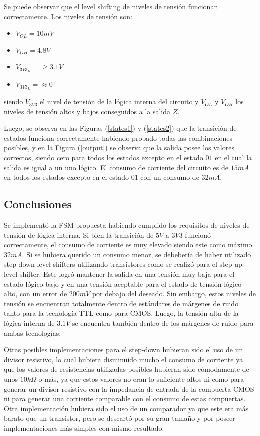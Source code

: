 Se puede observar que el level shifting de niveles de tensión funcionan correctamente. Los niveles de tensión son:
\begin{itemize}
\item $V_{OL} = 10mV$
\item $V_{OH} = 4.8V$
\item $V_{3V3_{H}} = \geq 3.1V$
\item $V_{3V3_{L}} = \approx 0$
\end{itemize}
siendo $V_{3V3}$ el nivel de tensión de la lógica interna del circuito y $V_{OL}$ y $V_{OH}$ los niveles de tensión altos y bajos conseguidos a la salida $Z$.

Luego, se observa en las Figuras (\ref{states1}) y (\ref{states2}) que la transición de estados funciona correctamente habiendo probado todas las combinaciones posibles, y en la Figura (\ref{output}) se observa que la salida posee los valores correctos, siendo cero para todos los estados excepto en el estado $01$ en el cual la salida es igual a un uno lógico. 
El consumo de corriente del circuito es de $15mA$ en todos los estados excepto en el estado $01$ con un consumo de $32mA$.

\subsection{Conclusiones}

Se implementó la FSM propuesta habiendo cumplido los requisitos de niveles de tensión de lógica interna. Si bien la transición de $5V$ a $3V3$ funcionó correctamente, el consumo de corriente es muy elevado siendo este como máximo $32mA$. Si se hubiera querido un consumo menor, se debebería de haber utilizado step-down level-shifters utilizando transistores como se realizó para el step-up level-shifter. Este logró mantener la salida en una tensión muy baja para el estado lógico bajo y en una tensión aceptable para el estado de tensión lógico alto, con un error de $200mV$ por debajo del deseado. Sin embargo, estos niveles de tensión se encuentran totalmente dentro de estándares de márgenes de ruido tanto para la tecnología TTL como para CMOS. Luego, la tensión alta de la lógica interna de $3.1V$ se encuentra también dentro de los márgenes de ruido para ambas tecnologías.


Otras posibles implementaciones para el step-down hubieran sido el uso de un divisor resistivo, lo cual hubiera disminuido mucho el consumo de corriente ya que los valores de resistencias utilizadas posibles hubieran sido cómodamente de unos $10k\Omega$ o más, ya que estos valores no eran lo suficiente altos ni como para generar un divisor resistivo con la impedancia de entrada de la compuerta CMOS ni para generar una corriente comparable con el consumo de estas compuertas. Otra implementación hubiera sido el uso de un comparador ya que este era más barato que un transistor, pero se descartó por su gran tamaño y por poseer implementaciones más simples con mismo resultado.
 

